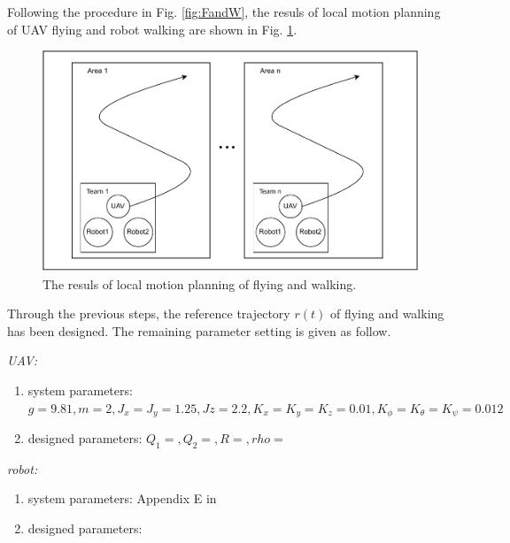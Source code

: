 \documentclass{ieeeaccess}
\begin{document}
Following the procedure in Fig. \ref{fig:FandW}, the resuls of local motion planning of UAV flying and robot walking are shown in Fig. \ref{fig:sim:FandW}.
\begin{figure}[htbp]
    \centering
    \includegraphics[scale=.42]{fig/1.pdf}\caption{The resuls of local motion planning of flying and walking.}%
    \label{fig:sim:FandW}
\end{figure}

Through the previous steps, the reference trajectory $r(t)$ of flying and walking has been designed. The remaining parameter setting is given as follow.

\textit{UAV:}\begin{enumerate}
    \item system parameters: $g = 9.81, m = 2,
    J_x = J_y = 1.25, Jz = 2.2,
    K_x = K_y = K_z = 0.01,
    K_\phi = K_\theta = K_\psi = 0.012$
    \item designed parameters: $Q_1=,Q_2=,R=,rho=$ %
\end{enumerate}

\textit{robot:} \begin{enumerate}
    \item system parameters: Appendix E in \cite{ourrobot}
    \item designed parameters:
\end{enumerate}
\end{document}
